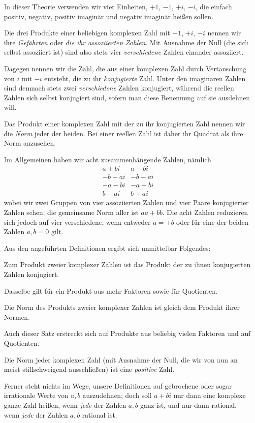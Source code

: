 %
In dieser Theorie verwenden wir vier Einheiten, $+1$, $-1$, $+i$, $-i$, die einfach positiv, negativ, positiv imaginär und negativ imaginär heißen sollen.

Die drei Produkte einer beliebigen komplexen Zahl mit $-1$, $+i$, $-i$ nennen wir ihre \emph{Gefährten} oder \emph{die ihr assoziierten Zahlen}. Mit Ausnahme der Null (die sich selbst assoziiert ist) sind also stets vier \emph{verschiedene} Zahlen einander assoziiert.

Dagegen nennen wir die Zahl, die aus einer komplexen Zahl durch Vertauschung von $i$ mit $-i$ entsteht, die zu ihr \emph{konjugierte} Zahl. Unter den imaginären Zahlen sind demnach stets zwei \emph{verschiedene} Zahlen konjugiert, während die reellen Zahlen sich selbst konjugiert sind, sofern man diese Benennung auf sie ausdehnen will.

Das Produkt einer komplexen Zahl mit der zu ihr konjugierten Zahl nennen wir die \emph{Norm} jeder der beiden. Bei einer reellen Zahl ist daher ihr Quadrat als ihre Norm anzusehen.

Im Allgemeinen haben wir acht zusammenhängende Zahlen, nämlich
\[
\begin{array}{r|r}
a+bi&a-bi\\
-b+ai&-b-ai\\
-a-bi&-a+bi\\
b-ai&b+ai
\end{array}
\]
wobei wir zwei Gruppen von vier assoziierten Zahlen und vier Paare konjugierter Zahlen sehen; die gemeinsame Norm aller ist $aa+bb$. Die acht Zahlen reduzieren sich jedoch auf vier verschiedene, wenn entweder $a=\pm b$ oder für eine der beiden Zahlen $a,b=0$ gilt.

Aus den angeführten Definitionen ergibt sich unmittelbar Folgendes:

Zum Produkt zweier komplexer Zahlen ist das Produkt der zu ihnen konjugierten Zahlen konjugiert.

Dasselbe gilt für ein Produkt aus mehr Faktoren sowie für Quotienten.

Die Norm des Produkts zweier komplexer Zahlen ist gleich dem Produkt ihrer Normen.

Auch dieser Satz erstreckt sich auf Produkte aus beliebig vielen Faktoren und auf Quotienten.

Die Norm jeder komplexen Zahl (mit Ausnahme der Null, die wir von nun an meist stillschweigend ausschließen) ist eine \emph{positive} Zahl.

Ferner steht nichts im Wege, unsere Definitionen auf gebrochene oder sogar irrationale Werte von $a,b$ auszudehnen; doch soll $a+bi$ nur dann eine komplexe ganze Zahl heißen, wenn \emph{jede} der Zahlen $a,b$ ganz ist, und nur dann rational, wenn \emph{jede} der Zahlen $a,b$ rational ist.

